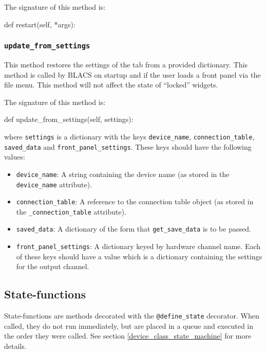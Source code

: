 \documentclass[12pt]{article}
\begin{document}
The signature of this method is:
\begin{python}
def restart(self, *args):
\end{python}


\subsubsection{\texttt{update\_from\_settings}}\label{ref:update_from_settings}
This method restores the settings of the tab from a provided dictionary.
This method is called by BLACS on startup and if the user loads a front panel via the file menu.
This method will not affect the state of ``locked'' widgets.

The signature of this method is:
\begin{python}
def update_from_settings(self, settings):
\end{python}
where \texttt{settings} is a dictionary with the keys \texttt{device\_name}, \texttt{connection\_table}, \texttt{saved\_data} and \texttt{front\_panel\_settings}.
These keys should have the following values:

\begin{itemize}
	\item \texttt{device\_name}: A string containing the device name (as stored in the \texttt{device\_name} attribute).
	\item \texttt{connection\_table}: A reference to the connection table object (as stored in the \texttt{\_connection\_table} attribute).
	\item \texttt{saved\_data}: A dictionary of the form that \texttt{get\_save\_data} is to be passed.
	\item \texttt{front\_panel\_settings}: A dictionary keyed by hardware channel name. 
	Each of these keys should have a value which is a dictionary containing the settings for the output channel. 
\end{itemize}


%
%
% 
%
\subsection{State-functions}\label{ref:statefunctions}
State-functions are methods decorated with the \texttt{@define\_state} decorator. 
When called, they do not run immediately, but are placed in a queue and executed in the order they were called.
See section \ref{device_class_state_machine} for more details.
\end{document}
